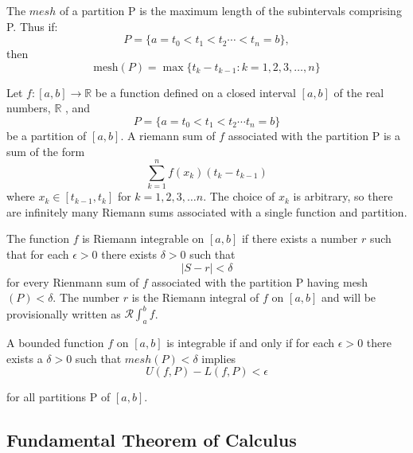 \documentclass{notes}
\begin{document}
\begin{definition}[Mesh]{}
	The $mesh$ of a partition P is the maximum length of the subintervals
	comprising P. Thus if:
	$$P = \{a = t_0 < t_1 <t_2 \cdots <t_n=b\},$$
	then 
	$$ \text{mesh}(P) = \max \{t_k - t_{k-1}: k = 1,2,3,\ldots,n\}$$
\end{definition}

\begin{definition}{}
	Let ${f:[a,b]\rightarrow \mathbb {R} }$ be a function defined on a closed interval $[a,b]$ of the real numbers, $\mathbb {R}$ , and
	$$P = \{a = t_0< t_1< t_2 \cdots t_n = b\}$$
	be a partition of $[a,b]$. A riemann sum of $f$ associated with  the  partition P is a sum of the form
	$$\sum_{k = 1}^{n} f(x_k)(t_k - t_{k-1})$$
	where $x_k \in [t_{k-1},t_k]$ for $k = 1,2, 3, \ldots n$. The choice of $x_k$ is arbitrary, so there are infinitely many Riemann sums associated with a single function and partition.
\end{definition}

\begin{definition}{}
The function $f$ is Riemann integrable on $[a, b]$ if there exists a
number $r$ such that for each $\epsilon > 0$ there exists
$\delta > 0$ such that
$$|S-r| < \delta $$
	for every Rienmann sum of $f$ associated with the partition P having mesh$(P)< \delta$. The number $r$ is the Riemann integral of $f$ on $[a,b]$ and will be provisionally written as $\mathcal{R} \int_{a}^{b}f$.
\end{definition}

\begin{theorem}{}
	A bounded function $f$ on $[a, b]$ is integrable if and only if for each
	$\epsilon > 0$ there exists a $\delta > 0$ such that
	$mesh(P) < \delta$ implies
	$$U(f, P) - L(f, P) < \epsilon$$
	
	for all partitions P of $[a, b]$.
\end{theorem}



\subsection{Fundamental Theorem of Calculus}
\end{document}
